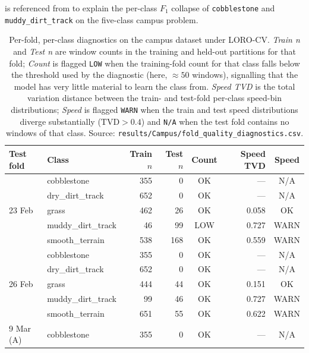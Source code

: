  is referenced from  to explain the per-class $F_1$ collapse of \texttt{cobblestone} and \texttt{muddy\_dirt\_track} on the five-class campus problem.

\begin{table}[H]
\centering
\caption{Per-fold, per-class diagnostics on the campus dataset under LORO-CV. \textit{Train n} and \textit{Test n} are window counts in the training and held-out partitions for that fold; \textit{Count} is flagged \texttt{LOW} when the training-fold count for that class falls below the threshold used by the diagnostic (here, $\approx 50$ windows), signalling that the model has very little material to learn the class from. \textit{Speed TVD} is the total variation distance between the train- and test-fold per-class speed-bin distributions; \textit{Speed} is flagged \texttt{WARN} when the train and test speed distributions diverge substantially ($\mathrm{TVD} > 0.4$) and \texttt{N/A} when the test fold contains no windows of that class. Source: \texttt{results/Campus/fold\_quality\_diagnostics.csv}.}
\label{tab:fold_quality_campus}
\small
\renewcommand{\arraystretch}{1.05}
\begin{tabular}{llrrcrc}
\toprule
\textbf{Test fold} & \textbf{Class} & \textbf{Train $n$} & \textbf{Test $n$} & \textbf{Count} & \textbf{Speed TVD} & \textbf{Speed} \\
\midrule
\multirow{5}{*}{23 Feb}
  & cobblestone         & 355 & 0   & OK  & ---   & N/A  \\
  & dry\_dirt\_track    & 652 & 0   & OK  & ---   & N/A  \\
  & grass               & 462 & 26  & OK  & 0.058 & OK   \\
  & muddy\_dirt\_track  & 46  & 99  & LOW & 0.727 & WARN \\
  & smooth\_terrain     & 538 & 168 & OK  & 0.559 & WARN \\
\midrule
\multirow{5}{*}{26 Feb}
  & cobblestone         & 355 & 0   & OK  & ---   & N/A  \\
  & dry\_dirt\_track    & 652 & 0   & OK  & ---   & N/A  \\
  & grass               & 444 & 44  & OK  & 0.151 & OK   \\
  & muddy\_dirt\_track  & 99  & 46  & OK  & 0.727 & WARN \\
  & smooth\_terrain     & 651 & 55  & OK  & 0.622 & WARN \\
\midrule
\multirow{5}{*}{9 Mar (A)}
  & cobblestone         & 355 & 0   & OK  & ---   & N/A  \\

\end{tabular}
\end{table}
